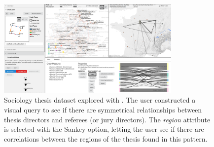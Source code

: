 \begin{figure}[!ht]
    \centering
    \includegraphics[width=0.8\textwidth]{static/figures/ComBiNet/Thesis-query01-and-results}
    \caption{Sociology thesis dataset explored with \name. The user constructed a visual query to see if there are symmetrical relationships between thesis directors and referees (or jury directors). The \textit{region} attribute is selected with the Sankey option, letting the user see if there are correlations between the regions of the thesis found in this pattern.  }\label{fig:combinet-thesis-query}
\end{figure}









